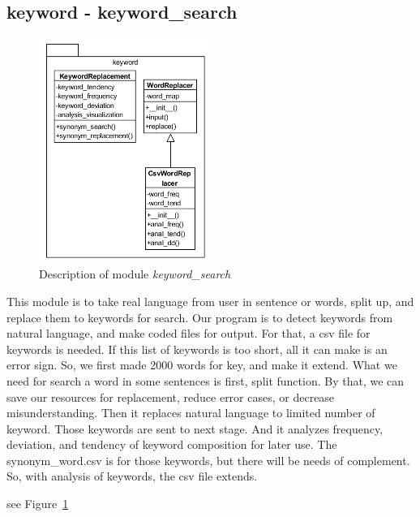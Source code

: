 \documentclass[conference]{IEEEtran}
\begin{document}
\subsection{keyword - keyword\_search} %
\label{sub:keyword_search}
\begin{figure}[ht]
\centering
\includegraphics[width=0.5\textwidth]{./figures/keyword_search.png}
\caption{Description of module \textit{keyword\_search}}
\label{keyword_search}
\end{figure}


This module is to take real language from user in sentence or words, split up, and replace them to keywords for search. Our program is to detect keywords from natural language, and make coded files for output. For that, a csv file for keywords is needed. If this list of keywords is too short, all it can make is an error sign. So, we first made 2000 words for key, and make it extend. What we need for search a word in some sentences is first, split function. By that, we can save our resources for replacement, reduce error cases, or decrease misunderstanding. Then it replaces natural language to limited number of keyword. Those keywords are sent to next stage. And it analyzes frequency, deviation, and tendency of keyword composition for later use. The synonym\_word.csv is for those keywords, but there will be needs of complement. So, with analysis of keywords, the csv file extends. 


see Figure~\ref{keyword_search}
\end{document}
